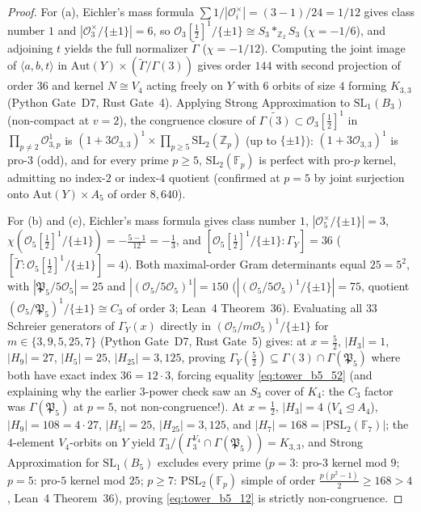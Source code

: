 \documentclass[11pt]{amsart}
\numberwithin{equation}{section}
\theoremstyle{plain}
\theoremstyle{definition}\newtheorem{definition}[theorem]{Definition}
\theoremstyle{remark}\newtheorem{remark}[theorem]{Remark}
\newcommand{\Z}{\mathbb{Z}}
\newcommand{\F}{\mathbb{F}}
\newcommand{\calO}{\mathcal{O}}
\newcommand{\PSL}{\mathrm{PSL}}
\newcommand{\SL}{\mathrm{SL}}
\newcommand{\Aut}{\mathrm{Aut}}
\begin{document}
\begin{proof}
For (a), Eichler's mass formula $\sum 1/|\calO_i^\times|=(3-1)/24=1/12$ gives class number $1$ and $|\calO_3^\times/\{\pm 1\}|=6$, so $\calO_3[\frac12]^1/\{\pm 1\}\cong S_3*_{\Z_2}S_3$ ($\chi=-1/6$), and adjoining $t$ yields the full normalizer $\tilde{\Gamma}$ ($\chi=-1/12$). Computing the joint image of $\langle a,b,t\rangle$ in $\Aut(Y)\times (\tilde{\Gamma}/\Gamma(3))$ gives order $144$ with second projection of order $36$ and kernel $N\cong V_4$ acting freely on $Y$ with $6$ orbits of size $4$ forming $K_{3,3}$ (Python Gate~D7, Rust Gate~4). Applying Strong Approximation to $\SL_1(B_3)$ (non-compact at $v=2$), the congruence closure of $\widetilde{\Gamma(3)}\subset\calO_3[\frac12]^1$ in $\prod_{p\ne 2}\calO_{3,p}^1$ is $(1+3\calO_{3,3})^1\times\prod_{p\ge 5}\SL_2(\Z_p)$ (up to $\{\pm 1\}$): $(1+3\calO_{3,3})^1$ is pro-$3$ (odd), and for every prime $p\ge 5$, $\SL_2(\F_p)$ is perfect with pro-$p$ kernel, admitting no index-$2$ or index-$4$ quotient (confirmed at $p=5$ by joint surjection onto $\Aut(Y)\times A_5$ of order $8{,}640$).

For (b) and (c), Eichler's mass formula gives class number $1$, $|\calO_5^\times/\{\pm 1\}|=3$, $\chi(\calO_5[\tfrac12]^1/\{\pm 1\})=-\frac{5-1}{12}=-\frac13$, and $[\calO_5[\tfrac12]^1/\{\pm 1\}:\Gamma_Y]=36$ ($[\tilde{\Gamma}:\calO_5[\tfrac12]^1/\{\pm 1\}]=4$). Both maximal-order Gram determinants equal $25=5^2$, with $|\mathfrak{P}_5/5\calO_5|=25$ and $|(\calO_5/5\calO_5)^1|=150$ ($|(\calO_5/5\calO_5)^1/\{\pm 1\}|=75$, quotient $(\calO_5/\mathfrak{P}_5)^1/\{\pm 1\}\cong C_3$ of order $3$; Lean~4 Theorem~36). Evaluating all $33$ Schreier generators of $\Gamma_Y(x)$ directly in $(\calO_5/m\calO_5)^1/\{\pm 1\}$ for $m\in\{3,9,5,25,7\}$ (Python Gate~D7, Rust Gate~5) gives: at $x=\tfrac52$, $|H_3|=1$, $|H_9|=27$, $|H_5|=25$, $|H_{25}|=3{,}125$, proving $\Gamma_Y(\tfrac52)\subseteq\Gamma(3)\cap\Gamma(\mathfrak{P}_5)$ where both have exact index $36=12\cdot 3$, forcing equality \eqref{eq:tower_b5_52} (and explaining why the earlier $3$-power check saw an $S_3$ cover of $K_4$: the $C_3$ factor was $\Gamma(\mathfrak{P}_5)$ at $p=5$, not non-congruence!). At $x=\tfrac12$, $|H_3|=4$ ($V_4\trianglelefteq A_4$), $|H_9|=108=4\cdot 27$, $|H_5|=25$, $|H_{25}|=3{,}125$, and $|H_7|=168=|\PSL_2(\F_7)|$; the $4$-element $V_4$-orbits on $Y$ yield $T_3/(\Gamma_3^{V_4}\cap\Gamma(\mathfrak{P}_5))=K_{3,3}$, and Strong Approximation for $\SL_1(B_5)$ excludes every prime ($p=3$: pro-$3$ kernel mod $9$; $p=5$: pro-$5$ kernel mod $25$; $p\ge 7$: $\PSL_2(\F_p)$ simple of order $\frac{p(p^2-1)}{2}\ge 168>4$, Lean~4 Theorem~36), proving \eqref{eq:tower_b5_12} is strictly non-congruence.
\end{proof}
\end{document}

